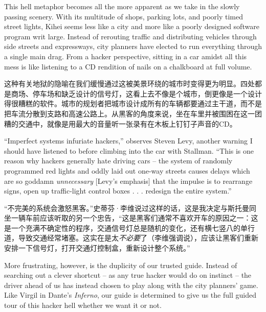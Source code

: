 \ifdefined\eng
This hell metaphor becomes all the more apparent as we take in the slowly passing scenery. With its multitude of shops, parking lots, and poorly timed street lights, Kihei seems less like a city and more like a poorly designed software program writ large. Instead of rerouting traffic and distributing vehicles through side streets and expressways, city planners have elected to run everything through a single main drag. From a hacker perspective, sitting in a car amidst all this mess is like listening to a CD rendition of nails on a chalkboard at full volume.
\fi

\ifdefined\chs
这种有关地狱的隐喻在我们缓慢通过这被美景环绕的城市时变得更为明显。四处都是商场、停车场和缺乏设计的信号灯，这看上去不像是个城市，倒更像是一个设计得很糟糕的软件。城市的规划者把城市设计成所有的车辆都要通过主干道，而不是把车流分散到支路和高速公路上。从黑客的角度来说，坐在车里并被围困在这一团糟的交通中，就像是用最大的音量听一张录有在木板上钉钉子声音的CD。
\fi

\ifdefined\eng
``Imperfect systems infuriate hackers,'' observes Steven Levy, another warning I should have listened to before climbing into the car with Stallman. ``This is one reason why hackers generally hate driving cars -- the system of randomly programmed red lights and oddly laid out one-way streets causes delays which are so goddamn \textit{unnecessary} [Levy's emphasis] that the impulse is to rearrange signs, open up traffic-light control boxes . . . redesign the entire system.''
\fi

\ifdefined\chs
``不完美的系统会激怒黑客。''史蒂芬·李维说过这样的话，这是我决定与斯托曼同坐一辆车前应该听取的另一个忠告，``这是黑客们通常不喜欢开车的原因之一：这是一个充满不确定性的程序，交通信号灯总是随机的变化，还有横七竖八的单行道，导致交通经常堵塞。这实在是太\textit{不必要}了（李维强调说），应该让黑客们重新安排一下信号灯，打开交通灯控制盒，重新设计整个系统。'' 
\fi

\ifdefined\eng
More frustrating, however, is the duplicity of our trusted guide. Instead of searching out a clever shortcut -- as any true hacker would do on instinct -- the driver ahead of us has instead chosen to play along with the city planners' game. Like Virgil in Dante's \textit{Inferno}, our guide is determined to give us the full guided tour of this hacker hell whether we want it or not.
\fi

